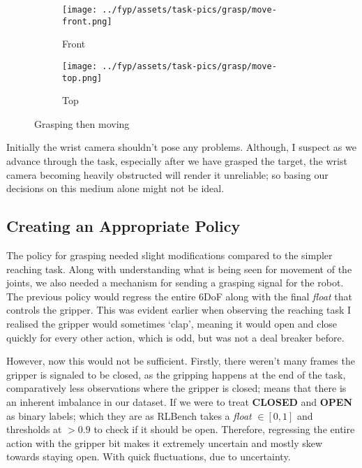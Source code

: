 \begin{figure}[htpb] %
  \centering
  \begin{subfigure}{0.45\linewidth}
    \centering
    \texttt{[image: ../fyp/assets/task-pics/grasp/move-front.png]} 
    \caption{Front}\label{subfig:grasp-move-front}
  \end{subfigure}
  \begin{subfigure}{0.45\linewidth}
    \centering
    \texttt{[image: ../fyp/assets/task-pics/grasp/move-top.png]}
    \caption{Top}\label{subfig:grasp-move-top}
  \end{subfigure}
  \caption{Grasping then moving}\label{fig:grasp-move}
\end{figure}



Initially the wrist camera shouldn't pose any problems. Although, I suspect as we advance through the task, especially after we have grasped the target, the wrist camera becoming heavily obstructed will render it unreliable; so basing our decisions on this medium alone might not be ideal.

\subsection{Creating an Appropriate Policy}
The policy for grasping needed slight modifications compared to the simpler reaching task. Along with understanding what is being seen for movement of the joints, we also needed a mechanism for sending a grasping signal for the robot. The previous policy would regress the entire 6DoF along with the final \emph{float} that controls the gripper. This was evident earlier when observing the reaching task I realised the gripper would sometimes `clap', meaning it would open and close quickly for every other action, which is odd, but was not a deal breaker before.

However, now this would not be sufficient. Firstly, there weren't many frames the gripper is signaled to be closed, as the gripping happens at the end of the task, comparatively less observations where the gripper is closed; means that there is an inherent imbalance in our dataset. If we were to treat \textbf{CLOSED} and \textbf{OPEN} as binary labels; which they are as RLBench takes a \emph{float} $\in \left[0, 1\right]$ and thresholds at $ > 0.9$ to check if it should be open. Therefore, regressing the entire action with the gripper bit makes it extremely uncertain and mostly skew towards staying open. With quick fluctuations, due to uncertainty.

